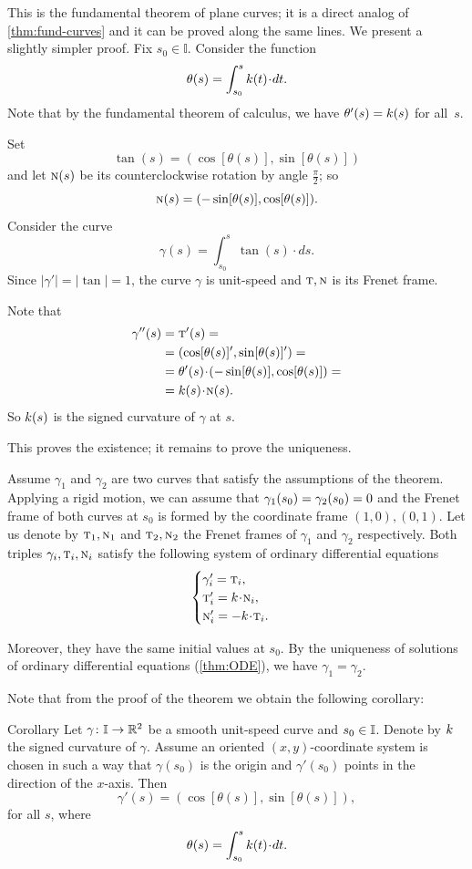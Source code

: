 This is the fundamental theorem of plane curves; it is a direct analog of \ref{thm:fund-curves} and it can be proved along the same lines.
We present a slightly simpler proof.
Fix $s_0\in\mathbb{I}$.
Consider the function
\[\theta(s)
=
\int_{s_0}^s\skur(t)\cdot dt.\]
Note that by the fundamental theorem of calculus, we have $\theta'(s)\z=\skur(s)$ for all~$s$.

Set 
\[\tan(s)=(\cos[\theta(s)],\sin[\theta(s)])\] and let $\text{\sc{n}}(s)$ be its counterclockwise rotation by angle $\tfrac\pi2$; so 
\[\text{\sc{n}}(s)=(-\sin[\theta(s)],\cos[\theta(s)]).\]
Consider the curve 
\[\gamma(s)=\int_{s_0}^s\tan(s)\cdot ds.\]
Since $|\gamma'|=|\tan|=1$, the curve $\gamma$ is unit-speed and $\text{\sc{t}},\text{\sc{n}}$ is its Frenet frame. 

Note that
\begin{align*}
\gamma''(s)&=\tan'(s)=
\\
&=(\cos[\theta(s)]',\sin[\theta(s)]')=
\\
&=\theta'(s)\cdot (-\sin[\theta(s)],\cos[\theta(s)])=
\\
&=\skur(s)\cdot \norm(s).
\end{align*}
So $k(s)$ is the signed curvature of $\gamma$ at $s$. 

This proves the existence;
it remains to prove the uniqueness.

Assume $\gamma_1$ and $\gamma_2$ are two curves that satisfy the assumptions of the theorem.
Applying a rigid motion, we can assume that $\gamma_1(s_0)\z=\gamma_2(s_0)\z=0$ and the Frenet frame of both curves at $s_0$ is formed by the coordinate frame $(1,0),(0,1)$.
Let us denote by $\text{\sc{t}}_1,\text{\sc{n}}_1$ and $\text{\sc{t}}_2,\text{\sc{n}}_2$ the Frenet frames of $\gamma_1$ and $\gamma_2$ respectively.
Both triples $\gamma_i,\text{\sc{t}}_i,\text{\sc{n}}_i$ satisfy the following system of ordinary differential equations 
\[
\begin{cases}
\gamma_i'=\tan_i,
\\
\tan_i'=\skur\cdot\norm_i,
\\
\norm_i'=-\skur\cdot\tan_i.
\end{cases}
\]

Moreover, they have the same initial values at $s_0$.
By the uniqueness of solutions of ordinary differential equations (\ref{thm:ODE}), we have $\gamma_1=\gamma_2$.
\qeds

Note that from the proof of the theorem we obtain the following corollary:



\begin{thm}{Corollary}\label{cor:2D-angle}
Let $\gamma\colon\mathbb{I}\to\mathbb{R}^2$ be a smooth unit-speed curve and $s_0\z\in \mathbb{I}$.
Denote by $k$ the signed curvature of $\gamma$.
Assume an oriented $(x,y)$-coordinate system is chosen in such a way that $\gamma(s_0)$ is the origin and $\gamma'(s_0)$ points in the direction of the $x$-axis.
Then 
\[\gamma'(s)=(\cos[\theta(s)],\sin[\theta(s)]) , \]
for all $s$, where 
\[\theta(s)=\int_{s_0}^s\skur(t)\cdot dt.\]
\end{thm}


